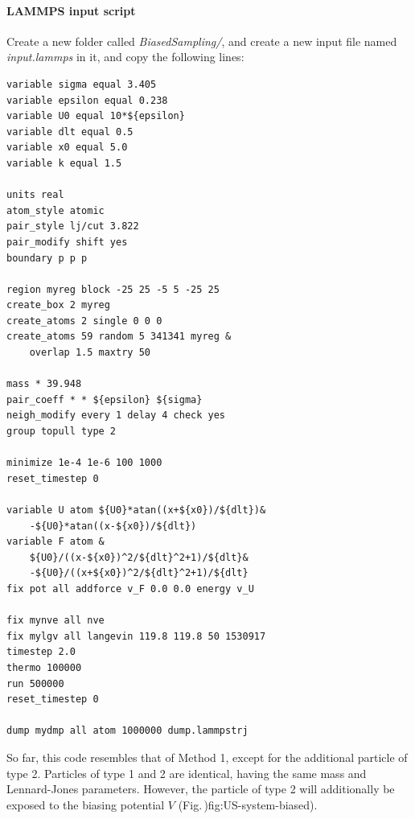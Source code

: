 \documentclass[9pt,tutorial]{livecoms}
\begin{document}
\paragraph{LAMMPS input script}
Create a new folder called \textit{BiasedSampling/}, and create a new input file named \textit{input.lammps} in it, and copy the following lines:
{\normalsize \begin{verbatim}
variable sigma equal 3.405
variable epsilon equal 0.238
variable U0 equal 10*${epsilon}
variable dlt equal 0.5
variable x0 equal 5.0
variable k equal 1.5

units real
atom_style atomic
pair_style lj/cut 3.822
pair_modify shift yes
boundary p p p

region myreg block -25 25 -5 5 -25 25
create_box 2 myreg
create_atoms 2 single 0 0 0
create_atoms 59 random 5 341341 myreg &
    overlap 1.5 maxtry 50

mass * 39.948
pair_coeff * * ${epsilon} ${sigma}
neigh_modify every 1 delay 4 check yes
group topull type 2

minimize 1e-4 1e-6 100 1000
reset_timestep 0

variable U atom ${U0}*atan((x+${x0})/${dlt})&
    -${U0}*atan((x-${x0})/${dlt})
variable F atom &
    ${U0}/((x-${x0})^2/${dlt}^2+1)/${dlt}&
    -${U0}/((x+${x0})^2/${dlt}^2+1)/${dlt}
fix pot all addforce v_F 0.0 0.0 energy v_U

fix mynve all nve
fix mylgv all langevin 119.8 119.8 50 1530917
timestep 2.0
thermo 100000
run 500000
reset_timestep 0

dump mydmp all atom 1000000 dump.lammpstrj
\end{verbatim}}
So far, this code resembles that of Method 1, except for the additional particle of type 2. Particles of type 1 and 2 
are identical, having the same mass and Lennard-Jones parameters. However, the particle of type 2 will additionally be exposed to the biasing potential $V$ (Fig.\,){fig:US-system-biased}).
\end{document}
